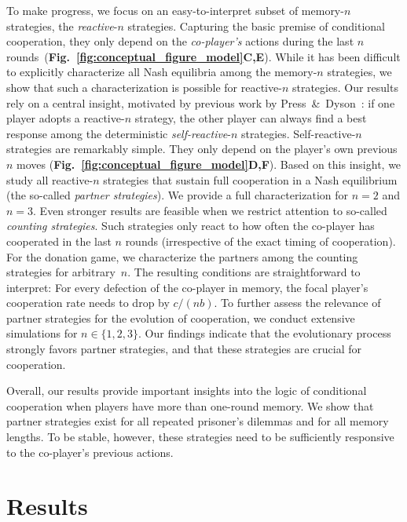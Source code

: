 \documentclass[11pt]{article}
\newcommand{\figref}[1]{{\textbf{Fig.~\ref{#1}}}}
\begin{document}
To make progress, we focus on an easy-to-interpret subset of memory-$n$ strategies, the {\it reactive}-$n$ strategies. 
Capturing the basic premise of conditional cooperation, they only depend on the {\it co-player's} actions during the last $n$ rounds~(\figref{fig:conceptual_figure_model}\textbf{C,E}). 
While it has been difficult to explicitly characterize all Nash equilibria among the memory-$n$ strategies, we show that such a characterization is possible for reactive-$n$ strategies. 
Our results rely on a central insight, motivated by previous work by Press~\&~Dyson~\citep{press:PNAS:2012}: 
if one player adopts a reactive-$n$ strategy, the other player can always find a best response among the deterministic {\it self-reactive}-$n$ strategies. 
Self-reactive-$n$ strategies are remarkably simple. 
They only depend on the player's own previous $n$ moves (\figref{fig:conceptual_figure_model}\textbf{D,F}).
Based on this insight, we study all reactive-$n$ strategies that sustain full cooperation in a Nash equilibrium (the so-called {\it partner strategies}). 
We provide a full characterization for $n\!=\!2$ and $n\!=\!3$.
Even stronger results are feasible when we restrict attention to so-called {\it counting strategies}.  
Such strategies only react to how often the co-player has cooperated in the last $n$ rounds (irrespective of the exact timing of cooperation). 
For the donation game, we characterize the partners among the counting strategies for arbitrary~$n$. 
The resulting conditions are straightforward to interpret:
For every defection of the co-player in memory, the focal player's cooperation rate needs to drop by $c/(nb)$.
To further assess the relevance of partner strategies for the evolution of cooperation, we conduct extensive simulations for $n\!\in\!\{1,2,3\}$. 
Our findings indicate that the evolutionary process strongly favors partner strategies, and that these strategies are crucial for cooperation. 

Overall, our results provide important insights into the logic of conditional cooperation when players have more than one-round memory. 
We show that partner strategies exist for all repeated prisoner's dilemmas and for all memory lengths. 
To be stable, however, these strategies need to be sufficiently responsive to the co-player's previous actions. 




\section*{Results}
\end{document}
